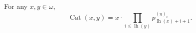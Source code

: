 For any $x, y \in \omega$,
$$\operatorname{Cat}(x, y) = x \cdot \prod_{i \leq \operatorname{lh}(y)} p_{\operatorname{lh}(x) + i + 1}^{(y)_i}.$$
